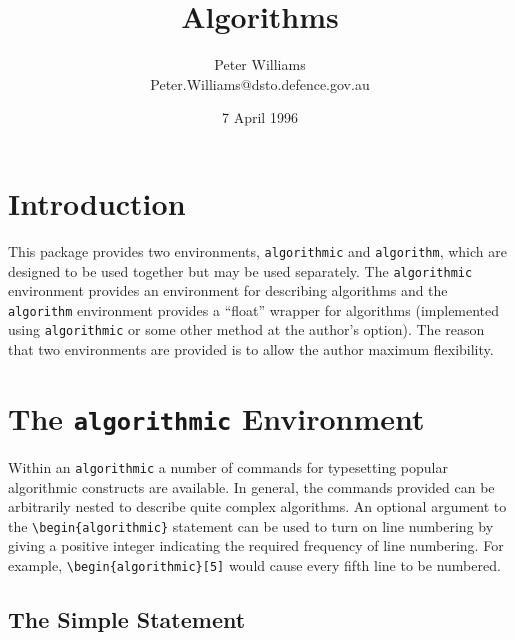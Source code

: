 \documentclass{article}
\title{Algorithms}
\author{Peter Williams \\ Peter.Williams@dsto.defence.gov.au}
\date{7 April 1996}
\newcommand{\keyword}[1]{\texttt{#1}}
\begin{document}
\maketitle
\tableofcontents
\listofalgorithms

\section{Introduction}

This package provides two environments, \keyword{algorithmic} and
\keyword{algorithm}, which are designed to be used together but may be used
separately.
The \keyword{algorithmic} environment provides an environment for describing
algorithms and the \keyword{algorithm} environment provides a ``float''
wrapper for algorithms (implemented using \keyword{algorithmic} or some
other method at the author's option).
The reason that two environments are provided is to allow the author
maximum flexibility.

\section{The \keyword{algorithmic} Environment}

Within an \keyword{algorithmic} a number of commands for typesetting
popular algorithmic constructs are available.
In general, the commands provided can be arbitrarily nested to
describe quite complex algorithms.
An optional argument to the \verb+\begin{algorithmic}+ statement can be
used to turn on line numbering by giving a positive integer indicating the
required frequency of line numbering.
For example, \verb+\begin{algorithmic}[5]+ would cause every fifth line to
be numbered.

\subsection{The Simple Statement}
\end{document}
